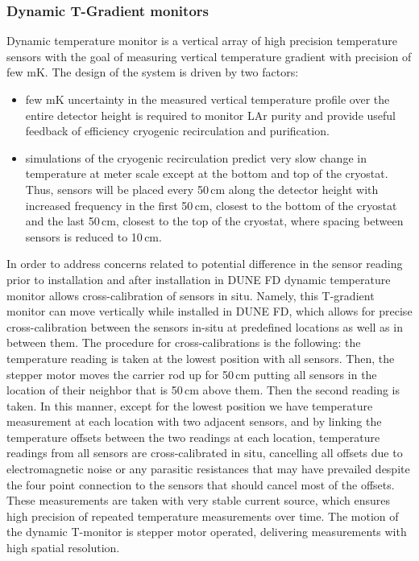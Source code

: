 \subsubsection{Dynamic T-Gradient monitors}
Dynamic temperature monitor is a vertical array of high precision temperature sensors with the goal of measuring vertical temperature gradient with precision of few mK. The design of the system is driven by two factors:
\begin{itemize}
\item
few mK uncertainty in the measured vertical temperature profile over the entire detector height is required to monitor LAr purity and provide useful feedback of efficiency cryogenic recirculation and purification.
\item
simulations of the cryogenic recirculation predict very slow change in temperature at meter scale except at the bottom and top of the cryostat. Thus, sensors will be placed every 50\,cm along the detector height with increased frequency in the first 50\,cm, closest to the bottom of the cryostat and the last 50\,cm, closest to the top of the cryostat, where spacing between sensors is reduced to 10\,cm.
 \end{itemize}
 
 In order to address concerns related to potential difference in the sensor reading prior to installation and after installation in DUNE FD dynamic temperature monitor allows cross-calibration of sensors in situ. Namely, this T-gradient monitor  can move vertically while installed in DUNE FD, which allows for precise cross-calibration between the sensors in-situ at predefined locations as well as in between them. The procedure for cross-calibrations is the following: the temperature reading is taken at the lowest position with all sensors. Then, the stepper motor moves the carrier rod up for 50\,cm putting all sensors in the location of their neighbor that is 50\,cm above them. Then the second reading is taken. In this manner, except for the lowest position we have temperature measurement at each location with two adjacent sensors, and by linking the temperature offsets between the two readings at each location, temperature readings from all sensors are cross-calibrated in situ, cancelling all offsets due to electromagnetic noise or any parasitic resistances that may have prevailed despite the four point connection to the sensors that should cancel most of the offsets. These measurements are taken with very stable current source, which ensures high precision of repeated temperature measurements over time. The motion of the dynamic T-monitor is stepper motor operated, delivering measurements with high spatial resolution. 

